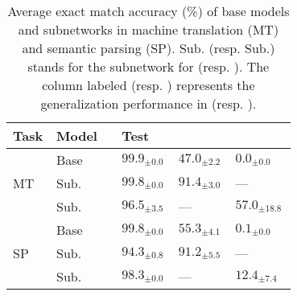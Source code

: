 \begin{table}[t]
    \centering
    \small
    \begin{tabular}{p{0.05\linewidth}p{0.22\linewidth}p{0.14\linewidth}p{0.14\linewidth}p{0.15\linewidth}}\toprule
    Task & Model & Test & \dobjppiobjpp{} & \dobjppsubjpp{}\\\midrule
    \multirow{3}{*}{MT} & Base & $99.9_{\pm 0.0}$ & $47.0_{\pm 2.2}$ & $0.0_{\pm 0.0}$  \\
    & \dobjppiobjpp{} Sub. & $99.8_{\pm 0.0}$ & $91.4_{\pm 3.0}$ & ---\\
    & \dobjppsubjpp{} Sub. & $96.5_{\pm 3.5}$ & --- & $57.0_{\pm 18.8}$ \\
    \multirow{3}{*}{SP} & Base & $99.8_{\pm 0.0}$ & $55.3_{\pm 4.1}$ & $0.1_{\pm 0.0}$\\
    & \dobjppiobjpp{} Sub. & $94.3_{\pm 0.8}$ & $91.2_{\pm 5.5}$ & ---\\
    & \dobjppsubjpp{} Sub. & $98.3_{\pm 0.0}$ & --- & $12.4_{\pm 7.4}$\\\bottomrule
    \end{tabular}
    \caption{Average exact match accuracy (\%) of base models and subnetworks in machine translation (MT) and semantic parsing (SP).
    \dobjppiobjpp{} Sub. (resp. \dobjppsubjpp{} Sub.) stands for the subnetwork for \dobjppiobjpp{} (resp. \dobjppsubjpp{}).
    The column labeled \dobjppiobjpp{} (resp. \dobjppsubjpp{}) represents the generalization performance in \dobjppiobjpp{} (resp. \dobjppsubjpp{}).}
    \label{tab:results_overall}
\end{table}